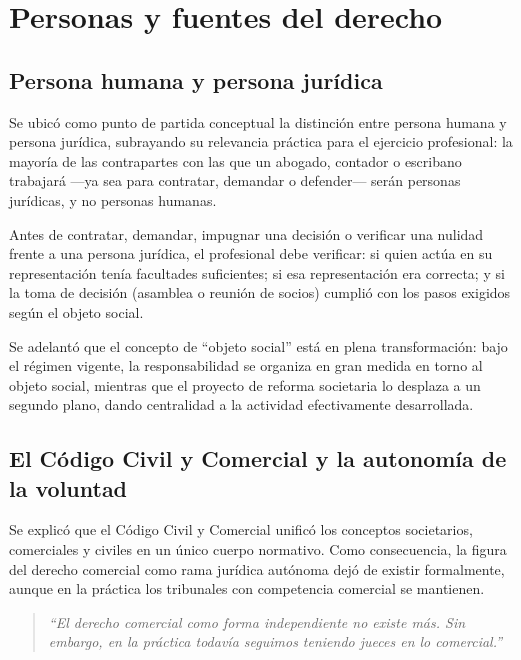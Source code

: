 \documentclass[12pt,oneside]{book}
\begin{document}
\chapter[Personas y fuentes del derecho]{Personas y fuentes del derecho}

\section{Persona humana y persona jurídica}

Se ubicó como punto de partida conceptual la distinción entre persona humana y persona jurídica, subrayando su relevancia práctica para el ejercicio profesional: la mayoría de las contrapartes con las que un abogado, contador o escribano trabajará —ya sea para contratar, demandar o defender— serán personas jurídicas, y no personas humanas.

\begin{important}
Antes de contratar, demandar, impugnar una decisión o verificar una nulidad frente a una persona jurídica, el profesional debe verificar: si quien actúa en su representación tenía facultades suficientes; si esa representación era correcta; y si la toma de decisión (asamblea o reunión de socios) cumplió con los pasos exigidos según el objeto social.
\end{important}

Se adelantó que el concepto de ``objeto social'' está en plena transformación: bajo el régimen vigente, la responsabilidad se organiza en gran medida en torno al objeto social, mientras que el proyecto de reforma societaria lo desplaza a un segundo plano, dando centralidad a la actividad efectivamente desarrollada.

\section{El Código Civil y Comercial y la autonomía de la voluntad}

Se explicó que el Código Civil y Comercial unificó los conceptos societarios, comerciales y civiles en un único cuerpo normativo. Como consecuencia, la figura del derecho comercial como rama jurídica autónoma dejó de existir formalmente, aunque en la práctica los tribunales con competencia comercial se mantienen.

\begin{quote}
\textit{``El derecho comercial como forma independiente no existe más. Sin embargo, en la práctica todavía seguimos teniendo jueces en lo comercial.''}
\end{quote}
\end{document}
